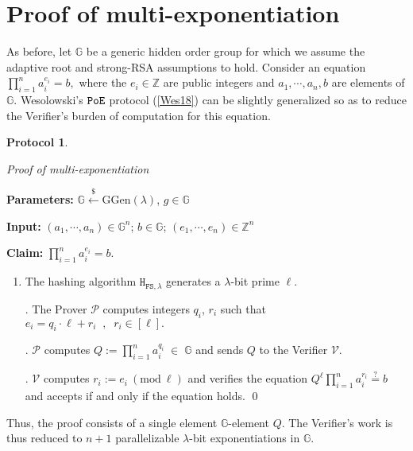 \documentclass[11pt, lettersize, notitlepage, leqno, footskip=0.6cm]{article}
\newcommand{\bz}{\mathbb Z}
\newcommand{\ttt}{\texttt}
\newcommand{\bG}{\mathbb{G}}
\newcommand{\mc}{\mathcal}
\newcommand{\mb}{\mathbb}
\newcommand{\mr}{\mathrm}
\newcommand{\lam}{\lambda}
\newcommand{\lamb}{\lambda}
\newcommand{\mP}{\mc{P}}
\newcommand{\V}{\mc{V}}
\newcommand{\vs}{\vspace{-0.15cm}}
\newcommand{\noin}{\noindent}
\newcommand{\sta}{\stackrel{?}{=}}
\newcommand{\Mod}[1]{\ (\mathrm{mod}\ #1)}
\newtheorem{Prot}[Thm]{Protocol}
\numberwithin{equation}{section}
\begin{document}
{{{\begin{comment}
\end{comment}

\newpage







\section{\fontsize{11}{11} \selectfont Proof of multi-exponentiation} \label{sec:multexp}

As before, let $\bG$ be a generic hidden order group for which we assume the adaptive root and strong-RSA assumptions to hold. Consider an equation $\prod_{i=1}^n a_i^{e_i} = b,$ where the $e_i\in\bz$ are public integers and $a_1,\cdots,a_n, b$ are elements of $\bG$. Wesolowski's $\tt{PoE}$ protocol (\hyperlink{Wes18}{[Wes18]}) can be slightly generalized so as to reduce the Verifier's burden of computation for this equation. 


\begin{Prot} \hypertarget{PoME}{Proof of multi-exponentiation}\end{Prot} \vspace{-0.3cm}

\noin \textbf{Parameters:} $\mb{G}\xleftarrow{\$} \mr{GGen}(\lamb)$,\; $g\in \mb{G}$

\noin \textbf{Input:} $(a_1,\cdots,a_n)\in\bG^n$; $b\in\bG$; $(e_1,\cdots,e_n)\in\bz^n$

\noin \textbf{Claim:} $\prod_{i=1}^n a_i^{e_i} = b$.

\begin{enumerate}[wide, labelwidth=!, labelindent=0pt]\vs \item The hashing algorithm $\ttt{H}_{\ttt{FS},\lam}$ generates a $\lam$-bit prime $\ell$.

\noin 2. The Prover $\mP$ computes integers $q_i$, $r_i$ such that $e_i = q_i\cdot \ell + r_i\;\;,\;\; r_i\in[\ell] .$

\noin 3. $\mP$ computes $Q:= \prod_{i=1}^n a_i^{q_i}\;\in\;\bG$ and sends $Q$ to the Verifier $\V$.

\noin 4. $\V$ computes $r_i:= e_i\Mod{\ell}$ and verifies the equation $ Q^{\ell}\prod_{i=1}^n a_i^{r_i} \sta b $ and accepts if and only if the equation holds. \qed  \end{enumerate}

Thus, the proof consists of a single element $\bG$-element $Q$. The Verifier's work is thus reduced to $n+1$ parallelizable $\lam$-bit exponentiations in $\bG$.\vspace{0.15cm}  

}}}
\end{document}
